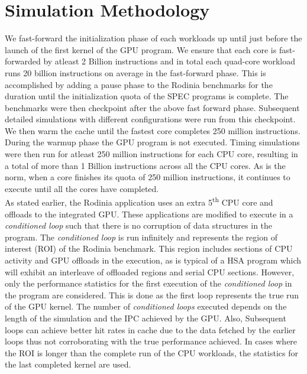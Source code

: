 \section{Simulation Methodology} 
We fast-forward the initialization phase of each workloads up until just before the launch of the first kernel of the GPU program. We ensure that each core is fast-forwarded by atleast 2 Billion instructions and in total each quad-core workload runs 20 billion instructions on average in the fast-forward phase. This is accomplished by adding a pause phase to the Rodinia benchmarks for the duration until the initialization quota of the SPEC programs is complete. The benchmarks were then checkpoint after the above fast forward phase. Subsequent detailed simulations with different configurations were run from this checkpoint.
We then warm the cache until the fastest core completes 250 million instructions. During the warmup phase the GPU program is not executed. Timing simulations were then run for atleast 250 million instructions for each CPU core, resulting in a total of more than 1 Billion instructions across all the CPU cores. As is the norm, when a core finishes its quota of 250 million instructions, it continues to execute until all the cores have completed. \\
As stated earlier, the Rodinia application uses an extra 5\textsuperscript{th} CPU core and offloads to the integrated GPU. These applications are modified to execute in a \textit{conditioned loop} such that there is no corruption of data structures in the program. The \textit{conditioned loop} is run infinitely and represents the region of interest (ROI) of the Rodinia benchmark. This region includes sections of CPU activity and GPU offloads in the execution, as is typical of a HSA program which will exhibit an interleave of offloaded regions and serial CPU sections. However, only the performance statistics for the first execution of the \textit{conditioned loop} in the program are considered. 
This is done as the first loop represents the true run of the GPU kernel. The number of \textit{conditioned loops} executed depends on the length of the simulation and the IPC achieved by the GPU. Also, Subsequent loops can achieve better hit rates in cache due to the data fetched by the earlier loops thus not corroborating with the true performance achieved.
In cases where the ROI is longer than the complete run of the CPU workloads, the statistics for the last completed kernel are used. 

